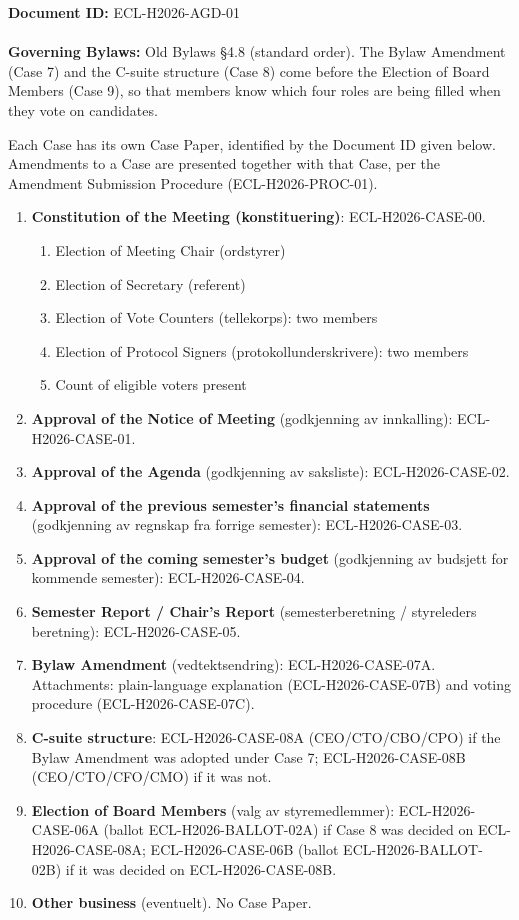 \documentclass{../../../Common/Latex/Templates/rapport}
\date{\meetingdate, \meetingtime}
\begin{document}
\makecoverpage
\reportmainmatter

\noindent\textbf{Document ID:} ECL-H2026-AGD-01\\
\meetingline\\
\textbf{Governing Bylaws:} Old Bylaws \S4.8 (standard order). The Bylaw Amendment (Case 7) and the C-suite structure (Case 8) come before the Election of Board Members (Case 9), so that members know which four roles are being filled when they vote on candidates.

Each Case has its own Case Paper, identified by the Document ID given below. Amendments to a Case are presented together with that Case, per the Amendment Submission Procedure (ECL-H2026-PROC-01).

\begin{enumerate}[label={\textbf{Case \arabic*.}}, leftmargin=*, itemsep=0.4em]
  \item \textbf{Constitution of the Meeting (konstituering)}: ECL-H2026-CASE-00.
        \begin{enumerate}[label=\alph*.]
          \item Election of Meeting Chair (ordstyrer)
          \item Election of Secretary (referent)
          \item Election of Vote Counters (tellekorps): two members
          \item Election of Protocol Signers (protokollunderskrivere): two members
          \item Count of eligible voters present
        \end{enumerate}
  \item \textbf{Approval of the Notice of Meeting} (godkjenning av innkalling): ECL-H2026-CASE-01.
  \item \textbf{Approval of the Agenda} (godkjenning av saksliste): ECL-H2026-CASE-02.
  \item \textbf{Approval of the previous semester's financial statements} (godkjenning av regnskap fra forrige semester): ECL-H2026-CASE-03.
  \item \textbf{Approval of the coming semester's budget} (godkjenning av budsjett for kommende semester): ECL-H2026-CASE-04.
  \item \textbf{Semester Report / Chair's Report} (semesterberetning / styreleders beretning): ECL-H2026-CASE-05.
  \item \textbf{Bylaw Amendment} (vedtektsendring): ECL-H2026-CASE-07A. Attachments: plain-language explanation (ECL-H2026-CASE-07B) and voting procedure (ECL-H2026-CASE-07C).
  \item \textbf{C-suite structure}: ECL-H2026-CASE-08A (CEO/CTO/CBO/CPO) if the Bylaw Amendment was adopted under Case 7; ECL-H2026-CASE-08B (CEO/CTO/CFO/CMO) if it was not.
  \item \textbf{Election of Board Members} (valg av styremedlemmer): ECL-H2026-CASE-06A (ballot ECL-H2026-BALLOT-02A) if Case 8 was decided on ECL-H2026-CASE-08A; ECL-H2026-CASE-06B (ballot ECL-H2026-BALLOT-02B) if it was decided on ECL-H2026-CASE-08B.
  \item \textbf{Other business} (eventuelt). No Case Paper.
\end{enumerate}
\end{document}
